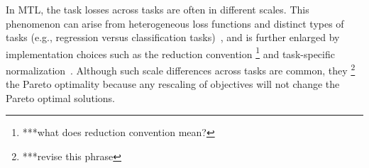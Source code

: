 \documentclass[sigconf]{acmart}
\begin{document}
In MTL, the task losses across tasks are often in different scales. This phenomenon can arise from heterogeneous loss functions and distinct types of tasks (e.g., regression versus classification tasks)~\cite{kendall2018multi}, and is further enlarged by implementation choices such as the reduction convention \footnote{***what does reduction convention mean? } and task-specific normalization~\cite{ren2015faster,he2017mask}. 
Although such scale differences across tasks are common, they \footnote{***revise this phrase } the Pareto optimality because any rescaling of objectives will not change the Pareto optimal solutions. 
\end{document}
